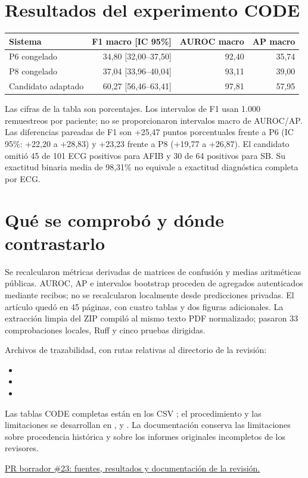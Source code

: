 \documentclass[11pt,a4paper]{article}
\begin{document}
\section*{Resultados del experimento CODE}
\begin{center}
\small
\begin{tabular}{lrrr}
\toprule
Sistema & F1 macro [IC 95\%] & AUROC macro & AP macro\\
\midrule
P6 congelado & 34,80 [32,00--37,50] & 92,40 & 35,74\\
P8 congelado & 37,04 [33,96--40,04] & 93,11 & 39,00\\
Candidato adaptado & 60,27 [56,46--63,41] & 97,81 & 57,95\\
\bottomrule
\end{tabular}
\end{center}
Las cifras de la tabla son porcentajes. Los intervalos de F1 usan 1.000 remuestreos por paciente; no se proporcionaron intervalos macro de AUROC/AP. Las diferencias pareadas de F1 son +25,47 puntos porcentuales frente a P6 (IC 95\%: +22,20 a +28,83) y +23,23 frente a P8 (+19,77 a +26,87). El candidato omitió 45 de 101 ECG positivos para AFIB y 30 de 64 positivos para SB. Su exactitud binaria media de 98,31\% no equivale a exactitud diagnóstica completa por ECG.

\section*{Qué se comprobó y dónde contrastarlo}
Se recalcularon métricas derivadas de matrices de confusión y medias aritméticas públicas. AUROC, AP e intervalos bootstrap proceden de agregados autenticados mediante recibos; no se recalcularon localmente desde predicciones privadas. El artículo quedó en 45 páginas, con cuatro tablas y dos figuras adicionales. La extracción limpia del ZIP compiló al mismo texto PDF normalizado; pasaron 33 comprobaciones locales, Ruff y cinco pruebas dirigidas.

Archivos de trazabilidad, con rutas relativas al directorio de la revisión:
\begin{itemize}
\item {}
\item {}
\item {}
\end{itemize}
Las tablas CODE completas están en los CSV ; el procedimiento y las limitaciones se desarrollan en ,  y . La documentación conserva las limitaciones sobre procedencia histórica y sobre los informes originales incompletos de los revisores.

\href{https://github.com/Mateo197802/titan-v45-ecg-multihead/pull/23}{PR borrador \#23: fuentes, resultados y documentación de la revisión.}
\end{document}
